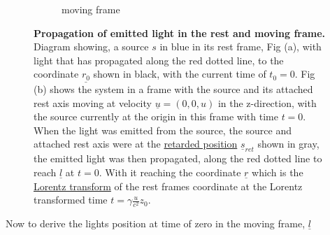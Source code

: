 \begin{figure}[H]
\begin{subfigure}{.49\textwidth}
		\caption{moving frame}
		\label{fig: primed frame 1}
	\end{subfigure}
	\caption{\textbf{Propagation of emitted light in the rest and moving frame.} Diagram showing, a source $s$ in blue in its rest frame, Fig (a), with light that has propagated along the red dotted line, to the coordinate $\underline{r_0}$ shown in black, with the current time of ${t_0} = 0$. Fig (b) shows the system in a frame with the source and its attached rest axis moving at velocity $\underline{u} = (0,0,u)$ in the z-direction, with the source currently at the origin in this frame with time ${t} = 0$. When the light was emitted from the source, the source and attached rest axis were at the \protect\hyperlink{def-retarded-position}{retarded position} $\underline{s}_{ret}$ shown in gray, the emitted light was then propagated, along the red dotted line to reach $\underline{l}$ at ${t} = 0$. With it reaching the coordinate $\underline{r}$ which is the \protect\hyperlink{def-lorentz-transform}{Lorentz transform} of the rest frames coordinate at the Lorentz transformed time $t=\gamma \frac{u}{c^2} z_0$.}
	\label{fig: appendix Retarded field outward field transform}
\end{figure}

Now to derive the lights position at time of zero in the moving frame, $\underline{l}$


